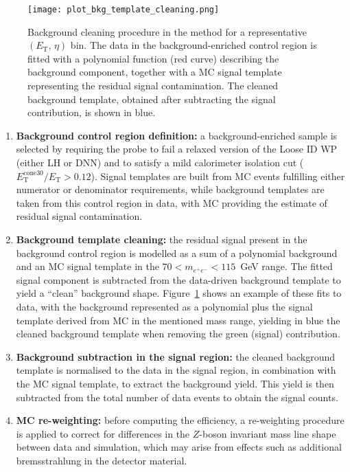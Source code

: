 \begin{figure}[htbp]
  \centering
  \texttt{[image: plot\_bkg\_template\_cleaning.png]}
  \caption{Background cleaning procedure in the \zmass method for a representative $(E_{\mathrm{T}},\,\eta)$ bin. The data in the background-enriched control region is fitted with a polynomial function (red curve) describing the background component, together with a MC signal template representing the residual signal contamination. The cleaned background template, obtained after subtracting the signal contribution, is shown in blue.}
  \label{fig:bkg_clean}
\end{figure}

\begin{enumerate}
    \item \textbf{Background control region definition:} a background-enriched sample is selected by requiring the probe to fail a relaxed version of the Loose ID WP (either LH or DNN) and to satisfy a mild calorimeter isolation cut ($E_{\mathrm{T}}^{\mathrm{cone30}}/E_{\mathrm{T}}>0.12$). Signal templates are built from MC events fulfilling either numerator or denominator requirements, while background templates are taken from this control region in data, with MC providing the estimate of residual signal contamination.

    \item \textbf{Background template cleaning:} the residual signal present in the background control region is modelled as a sum of a polynomial background and an MC signal template in the $70 < m_{e^+e^-} < 115$~GeV range. The fitted signal component is subtracted from the data-driven background template to yield a “clean” background shape. Figure~\ref{fig:bkg_clean} shows an example of these fits to data, with the background represented as a polynomial plus the signal template derived from MC in the mentioned mass range, yielding in blue the cleaned background template when removing the green (signal) contribution.

    \item \textbf{Background subtraction in the signal region:} the cleaned background template is normalised to the data in the signal region, in combination with the MC signal template, to extract the background yield. This yield is then subtracted from the total number of data events to obtain the signal counts.

    \item \textbf{MC re-weighting:} before computing the efficiency, a re-weighting procedure is applied to correct for differences in the $Z$-boson invariant mass line shape between data and simulation, which may arise from effects such as additional bremsstrahlung in the detector material.


\end{enumerate}
